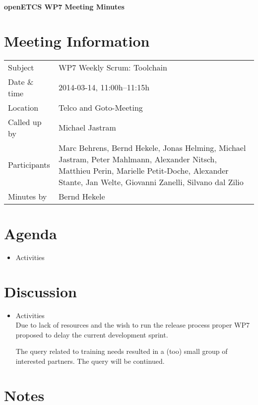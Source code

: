 \documentclass[a4paper, 11pt]{article}
\begin{document}
{\begin{center}\huge\bf openETCS WP7 Meeting Minutes\end{center}}
\section{Meeting Information}

\renewcommand{\arraystretch}{1.5}
\begin{supertabular}{m{.2\textwidth}m{.8\textwidth}}
Subject & WP7 Weekly Scrum: Toolchain\\
Date \& time & 2014-03-14, 11:00h--11:15h\\
Location & Telco and Goto-Meeting\\
Called up by & Michael Jastram\\
Participants &
Marc Behrens,
Bernd Hekele,
Jonas Helming,
Michael Jastram,
Peter Mahlmann,
Alexander Nitsch,
Matthieu Perin,
Marielle Petit-Doche,
Alexander Stante,
Jan Welte,
Giovanni Zanelli,
Silvano dal Zilio
\\

Minutes by & Bernd Hekele\\

\end{supertabular}
\renewcommand{\arraystretch}{1.0}


\section{Agenda}
\begin{itemize}
\item Activities
\end{itemize}

\section{Discussion}

\begin{itemize}
\item Activities\\
Due to lack of resources and the wish to run the release process proper WP7 proposed to delay the current development sprint.

The query related to training needs resulted in a (too) small group of interested partners. The query will be continued. 

\end{itemize}

\section{Notes}
\end{document}
